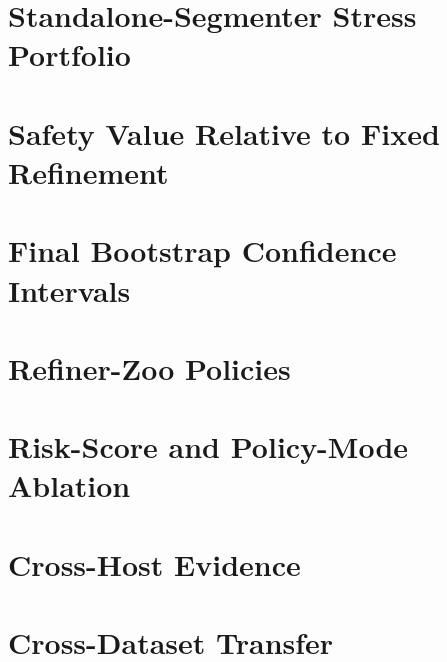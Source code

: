 \documentclass[preprint,12pt]{elsarticle}
\begin{document}




\section{Standalone-Segmenter Stress Portfolio}



\section{Safety Value Relative to Fixed Refinement}



\section{Final Bootstrap Confidence Intervals}



\section{Refiner-Zoo Policies}



\section{Risk-Score and Policy-Mode Ablation}









\section{Cross-Host Evidence}



\section{Cross-Dataset Transfer}
\end{document}
